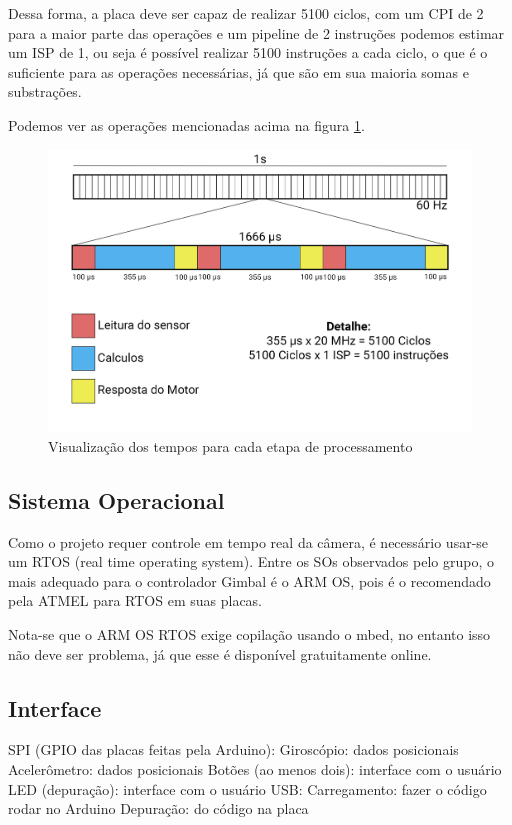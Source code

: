 Dessa forma, a placa deve ser capaz de realizar 5100 ciclos, com um CPI de 2 para a maior parte das operações e um pipeline de 2 instruções \cite{Datasheet} podemos estimar um ISP de 1, ou seja é possível realizar 5100 instruções a cada ciclo, o que é o suficiente para as operações necessárias, já que são em sua maioria somas e substrações.  

Podemos ver as operações mencionadas acima na figura \ref{fig:cal_tempo}.

\begin{figure}[H]
    \centering
    \includegraphics[width=1\textwidth,angle=0]{figures/calculos de tempo.png}
    \caption{Visualização dos tempos para cada etapa de processamento}
    \label{fig:cal_tempo}
\end{figure}




\subsection{Sistema Operacional}
Como o projeto requer controle em tempo real da câmera, é necessário usar-se um RTOS (real time operating system).
Entre os SOs observados pelo grupo, o mais adequado para o controlador Gimbal é o ARM OS, pois é o recomendado pela ATMEL para RTOS em suas placas.

Nota-se que o ARM OS RTOS exige copilação usando o mbed, no entanto isso não deve ser problema, já que esse é disponível gratuitamente online. 

\subsection{Interface}
SPI (GPIO das placas feitas pela Arduino):
Giroscópio: dados posicionais
Acelerômetro: dados posicionais
Botões (ao menos dois): interface com o usuário
LED (depuração): interface com o usuário
USB:
Carregamento: fazer o código rodar no Arduino 
Depuração: do código na placa


